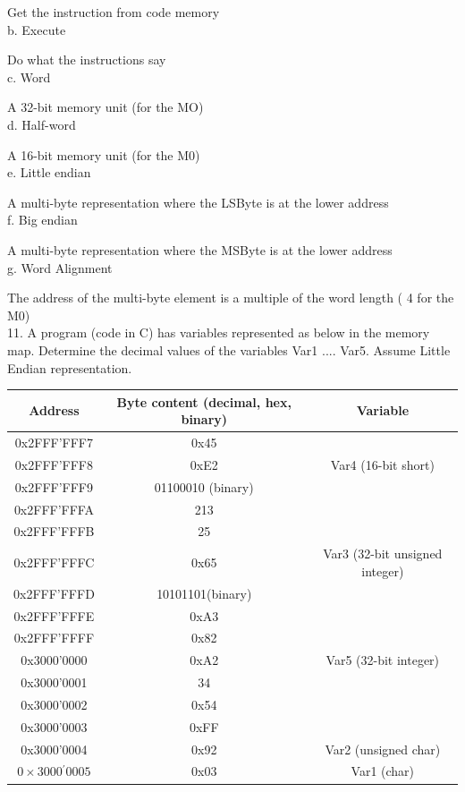 \documentclass[10pt]{article}
\begin{document}
Get the instruction from code memory\\
b. Execute

Do what the instructions say\\
c. Word

A 32-bit memory unit (for the MO)\\
d. Half-word

A 16-bit memory unit (for the M0)\\
e. Little endian

A multi-byte representation where the LSByte is at the lower address\\
f. Big endian

A multi-byte representation where the MSByte is at the lower address\\
g. Word Alignment

The address of the multi-byte element is a multiple of the word length ( 4 for the M0)\\
11. A program (code in C) has variables represented as below in the memory map. Determine the decimal values of the variables Var1 .... Var5. Assume Little Endian representation.

\begin{center}
\begin{tabular}{|c|c|c|}
\hline
Address & Byte content (decimal, hex, binary) & Variable \\
\hline
0x2FFF'FFF7 & 0x45 &  \\
\hline
0x2FFF'FFF8 & 0xE2 & Var4 (16-bit short) \\
\hline
0x2FFF'FFF9 & 01100010 (binary) &  \\
\hline
0x2FFF'FFFA & 213 &  \\
\hline
0x2FFF'FFFB & 25 &  \\
\hline
0x2FFF'FFFC & 0x65 & Var3 (32-bit unsigned integer) \\
\hline
0x2FFF'FFFD & 10101101(binary) &  \\
\hline
0x2FFF'FFFE & 0xA3 &  \\
\hline
0x2FFF'FFFF & 0x82 &  \\
\hline
0x3000'0000 & 0xA2 & Var5 (32-bit integer) \\
\hline
0x3000'0001 & 34 &  \\
\hline
0x3000'0002 & 0x54 &  \\
\hline
0x3000'0003 & 0xFF &  \\
\hline
0x3000'0004 & 0x92 & Var2 (unsigned char) \\
\hline
$0 \times 3000{ }^{\prime} 0005$ & 0x03 & Var1 (char) \\
\hline
\end{tabular}
\end{center}
\end{document}
